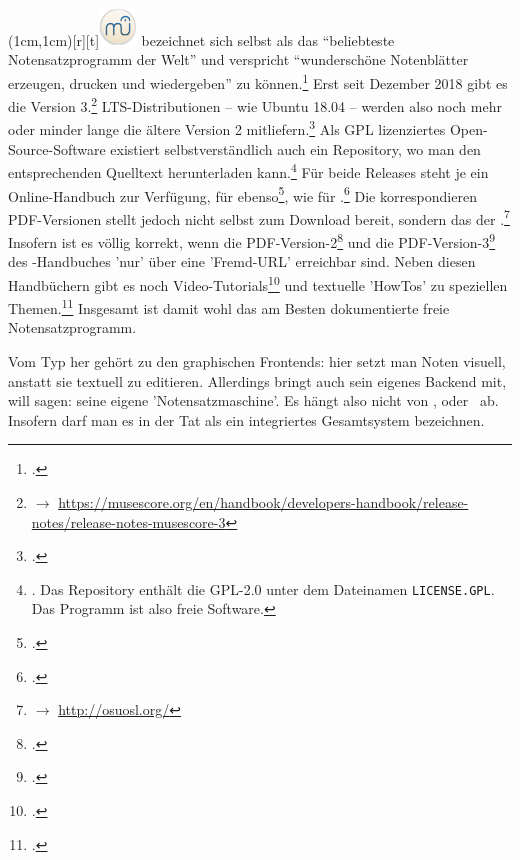 \parpic(1cm,1cm)[r][t]{\includegraphics[width=1cm]{logos/musescore-300dpi.png}}
\label{MuseScore} bezeichnet sich selbst als das
\enquote{beliebteste Notensatzprogramm der Welt} und verspricht
\enquote{wunderschöne Notenblätter erzeugen, drucken und wiedergeben} zu
können.\footcite[vgl.][\nopage wp.]{MuseScore2019a} Erst seit Dezember 2018 gibt
es die Version 3.\footnote{$\rightarrow$
\href{https://musescore.org/en/handbook/developers-handbook/release-notes/release-notes-musescore-3}
{https://musescore.org/en/handbook/developers-handbook/release-notes/release-notes-musescore-3}}
LTS-Distributionen -- wie Ubuntu 18.04 -- werden also noch mehr oder minder
lange die ältere Version 2 mitliefern.\footcite[vgl.][\nopage
wp.]{UbuntuMuseScore2018a} Als GPL lizenziertes Open-Source-Software existiert
selbstverständlich auch ein Repository, wo man den entsprechenden Quelltext
herunterladen kann.\footnote{\cite[vgl.][\nopage wp.]{GithubMuseScore2019a}. Das
Repository enthält die GPL-2.0 unter dem Dateinamen \texttt{LICENSE.GPL}. Das
Programm ist also freie Software.} Für beide Releases steht je ein
Online-Handbuch zur Verfügung, für 
ebenso\footcite[vgl.][\nopage wp.]{MuseScore2019c}, wie für
.\footcite[vgl.][\nopage wp.]{MuseScore2019d} Die korrespondieren
PDF-Versionen stellt jedoch nicht  selbst zum Download bereit,
sondern das  der .\footnote{
$\rightarrow$ \href{http://osuosl.org/}{http://osuosl.org/}} Insofern ist es
völlig korrekt, wenn die PDF-Version-2\footcite[vgl.][\nopage
wp.]{MuseScore2019h} und die PDF-Version-3\footcite[vgl.][\nopage
wp.]{MuseScore2019g} des -Handbuches 'nur' über eine 'Fremd-URL'
erreichbar sind. Neben diesen Handbüchern gibt es noch
Video-Tutorials\footcite[vgl.][\nopage wp.]{MuseScore2019e} und textuelle
'HowTos' zu speziellen Themen.\footcite[vgl.][\nopage wp.]{MuseScore2019f}
Insgesamt ist  damit wohl das am Besten dokumentierte freie
Notensatzprogramm.

Vom Typ her gehört  zu den graphischen Frontends:
hier setzt man Noten visuell, anstatt sie textuell zu editieren. Allerdings
bringt  auch sein eigenes Backend mit, will sagen: seine eigene
'Notensatzmaschine'. Es hängt also nicht von ,  oder
\ ab. Insofern darf man es in der Tat als ein integriertes
Gesamtsystem bezeichnen.

